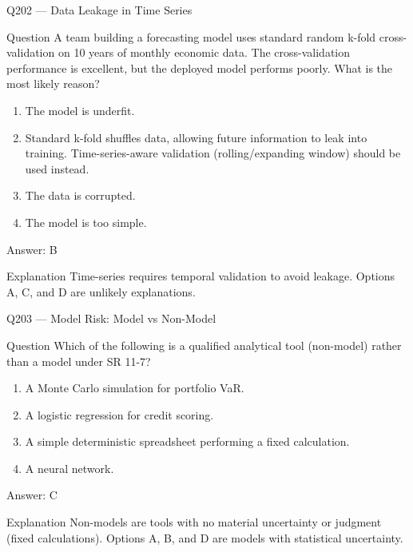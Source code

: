 \documentclass[aspectratio=169,8pt]{beamer}
\begin{document}
									\begin{frame}{Q202 --- Data Leakage in Time Series}
										\begin{block}{Question}
											A team building a forecasting model uses standard random k-fold cross-validation on 10 years of monthly economic data. The cross-validation performance is excellent, but the deployed model performs poorly. What is the most likely reason?
											\begin{enumerate}
												\item The model is underfit.
												\item Standard k-fold shuffles data, allowing future information to leak into training. Time-series-aware validation (rolling/expanding window) should be used instead.
												\item The data is corrupted.
												\item The model is too simple.
											\end{enumerate}  \end{block}
											\begin{exampleblock}{Answer: B}\end{exampleblock}
											\begin{block}{Explanation}
												Time-series requires temporal validation to avoid leakage. Options A, C, and D are unlikely explanations.
											\end{block}
										\end{frame}
										
										\begin{frame}{Q203 --- Model Risk: Model vs Non-Model}
											\begin{block}{Question}
												Which of the following is a qualified analytical tool (non-model) rather than a model under SR 11-7?
												\begin{enumerate}
													\item A Monte Carlo simulation for portfolio VaR.
													\item A logistic regression for credit scoring.
													\item A simple deterministic spreadsheet performing a fixed calculation.
													\item A neural network.
												\end{enumerate}  \end{block}
												\begin{exampleblock}{Answer: C}\end{exampleblock}
												\begin{block}{Explanation}
													Non-models are tools with no material uncertainty or judgment (fixed calculations). Options A, B, and D are models with statistical uncertainty.
												\end{block}
											\end{frame}
											
\end{document}
